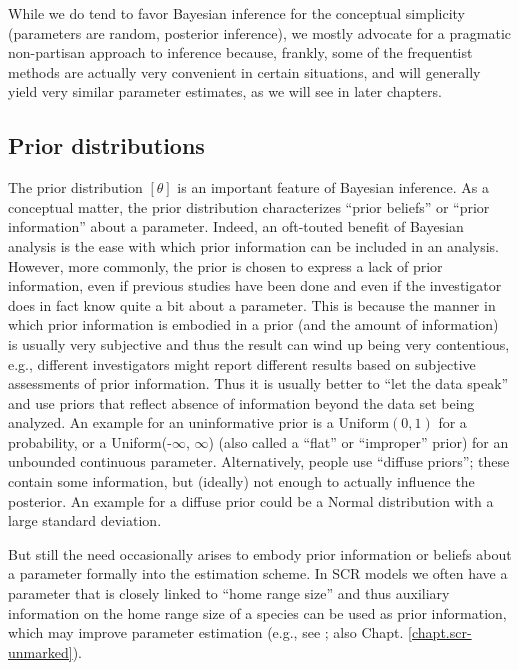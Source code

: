 While we do tend to favor Bayesian inference for the conceptual
simplicity (parameters are random, posterior inference), we mostly
advocate for a pragmatic non-partisan approach to inference because,
frankly, some of the frequentist methods are actually very
convenient in certain situations, and will generally yield very similar parameter estimates, as we will see in later chapters.


\subsection{Prior distributions}

The prior distribution $[\theta]$ is an important feature of Bayesian
inference. As a conceptual matter,
the prior distribution characterizes ``prior beliefs'' or ``prior
information'' about a parameter. Indeed,
an oft-touted benefit of Bayesian analysis is the ease with which
prior information can be included in an analysis. 
However, more commonly, the prior is chosen to
express a lack of prior information, even if previous studies have
been done and even if the investigator does in fact know quite a bit
about a parameter.
This is because
the manner in which prior information is embodied in a prior (and the
amount of information) is
usually very subjective and thus the result can wind up being very
contentious, e.g., different investigators might report different
results based on subjective assessments of prior information. Thus it is usually
better to ``let the data speak'' and use priors that reflect absence
of information beyond the data set being analyzed. An example for an uninformative prior is a $\mbox{Uniform}(0,1)$ for a probability, or a \mbox{Uniform}(-$\infty$, $\infty$) (also called a ``flat'' or ``improper'' prior) for an unbounded continuous parameter. Alternatively, people use ``diffuse priors''; these contain some information, but (ideally) not enough to actually influence the posterior. An example for a diffuse prior could be a Normal distribution with a large standard deviation.

But still the need occasionally arises to embody prior information or
beliefs about a parameter formally into the estimation scheme.
 In SCR models we often have a parameter that is closely linked
to ``home range size'' and thus auxiliary information on the home
range size of a species can be used as prior information, which may improve parameter estimation (e.g., see
\citet{chandler_royle:2012} ; also Chapt. \ref{chapt.scr-unmarked}).

